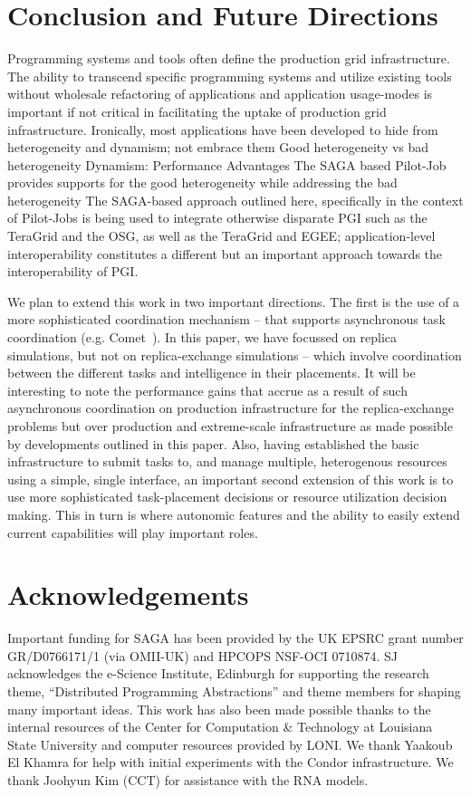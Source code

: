 \documentclass[conference,final]{IEEEtran}
\newcommand{\up}{\vspace*{-1em}}
\def\acknowledgementname{Acknowledgements}
\newenvironment{acknowledgement}%
{\section*{\acknowledgementname}%
\parindent=0pt%
}
\newcommand{\jhanote}[1]{ {\textcolor{red} { ***SJ: #1 }}}
\newcommand{\jhanote}[1]{}
\begin{document}
\section{Conclusion and Future Directions}
\up Programming systems and tools often define the production grid
infrastructure.  The ability to transcend specific programming systems
and utilize existing tools without wholesale refactoring of
applications and application usage-modes is important if not critical
in facilitating the uptake of production grid
infrastructure. Ironically, most applications have been developed to
hide from heterogeneity and dynamism; not embrace them Good
heterogeneity vs bad heterogeneity Dynamism: Performance Advantages
The SAGA based Pilot-Job provides supports for the good heterogeneity
while addressing the bad heterogeneity \jhanote{Introduce 2-3
  sentences summarising the results of this paper} \jhanote{make
  connection of this paper to practical results/impact.} The
SAGA-based approach outlined here, specifically in the context of
Pilot-Jobs is being used to integrate otherwise disparate PGI such as
the TeraGrid and the OSG, as well as the TeraGrid and EGEE;
application-level interoperability constitutes a different but an
important approach towards the interoperability of PGI.

We plan to extend this work in two important directions. The first is
the use of a more sophisticated coordination mechanism -- that
supports asynchronous task coordination
(e.g. Comet~\cite{comethpdc}). In this paper, we have focussed on
replica simulations, but not on replica-exchange simulations -- which
involve coordination between the different tasks and intelligence in
their placements.  It will be interesting to note the performance
gains that accrue as a result of such asynchronous coordination on
production infrastructure for the replica-exchange problems but over
production and extreme-scale infrastructure as made possible by
developments outlined in this paper. Also, having established the
basic infrastructure to submit tasks to, and manage multiple,
heterogenous resources using a simple, single interface, an important
second extension of this work is to use more sophisticated
task-placement decisions or resource utilization decision making.
This in turn is where autonomic features and the ability to easily
extend current capabilities will play important roles.

\up

\begin{acknowledgement} 
\up
  \footnotesize{Important funding for SAGA has been provided by the UK
    EPSRC grant number GR/D0766171/1 (via OMII-UK) and HPCOPS NSF-OCI
    0710874. SJ acknowledges the e-Science Institute, Edinburgh for
    supporting the research theme, ``Distributed Programming
    Abstractions'' and theme members for shaping many important
    ideas. This work has also been made possible thanks to the
    internal resources of the Center for Computation \& Technology at
    Louisiana State University and computer resources provided by
    LONI. We thank Yaakoub El Khamra for help with initial experiments
    with the Condor infrastructure. We thank Joohyun Kim (CCT) for
    assistance with the RNA models.}
\end{acknowledgement}

\up



\end{document}
